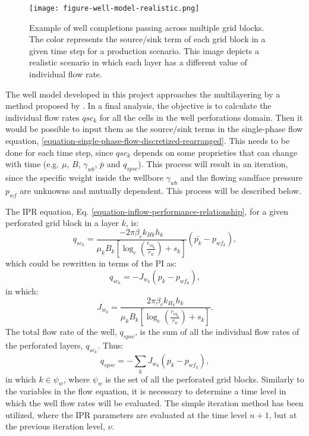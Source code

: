 %
\begin{figure}[h]
	\centering
	\texttt{[image: figure-well-model-realistic.png]}
	\caption{Example of well completions passing across multiple grid blocks. The color represents the source/sink term of each grid block in a given time step for a production scenario. This image depicts a realistic scenario in which each layer has a different value of individual flow rate.}
	\label{figure-well-model-realistic}
\end{figure}
%
The well model developed in this project approaches the multilayering by a method proposed by \cite{Ertekin2001}.
%
In a final analysis, the objective is to calculate the individual flow rates $q{sc_k}$ for all the cells in the well perforations domain.
%
Then it would be possible to input them as the source/sink terms in the single-phase flow equation, \ref{equation-single-phase-flow-discretized-rearranged}.
%
This needs to be done for each time step, since $q{sc_k}$ depends on some proprieties that can change with time (e.g. $\mu$, $B$, $\gamma_{wb}$, $\bar{p}$ and $q_{spsc}$).
%
This process will result in an iteration, since the specific weight inside the wellbore $\gamma_{wb}$ and the flowing sandface pressure $p_{wf}$ are unknowns and mutually dependent.
%
This process will be described below.

The IPR equation, Eq. \ref{equation-inflow-performance-relationship}, for a given perforated grid block in a layer $k$, is:
%
%
\begin{equation}
	q_{{sc}_k} = \frac{- 2 \pi \beta_c k_{H k} h_k}{\mu_k B_k \left[ \log_e \left(\frac{r_{eq_k}}{r_w}\right) + s_k\right]} (\bar{p_k}-p_{{wf}_k}),
\end{equation}
%
which could be rewritten in terms of the PI as:
%
\begin{equation}
	\label{equation-inflow-performance-relationship-multilayer}
	q_{{sc}_k} = - J_{w_k} \left( p_k - p_{wf_k} \right),
\end{equation}
%
in which:
%
\begin{equation}
	\label{equation-productivity-index-multilayer}
	J_{w_k} = \frac{ 2 \pi \beta_c k_{H_k} h_k}{\mu_k B_k\left[ \log_e \left(\frac{r_{eq_k}}{r_w}\right) + s_k\right]}.
\end{equation}
%
The total flow rate of the well, $q_{spsc}$, is the sum of all the individual flow rates of the perforated layers, $q_{{sc}_k}$. Thus:
%
\begin{equation}
	q_{spsc} = - \sum_{k} J_{w_k} (p_k- p_{wf_k}),
\end{equation}
%
in which $k \in \psi_w$, where $\psi_w$ is the set of all the perforated grid blocks.
%
Similarly to the variables in the flow equation, it is necessary to determine a time level in which the well flow rates will be evaluated.
%
The simple iteration method has been utilized, where the IPR parameters are evaluated at the time level $n+1$, but at the previous iteration level, $\nu$.


